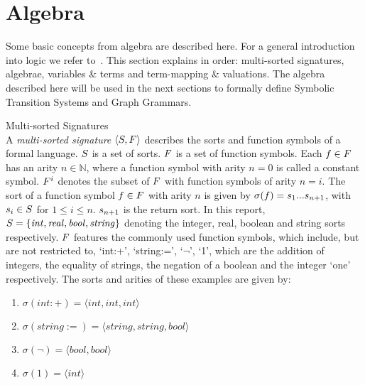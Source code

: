 \section{Algebra}\label{sec:algebra}

Some basic concepts from algebra are described here. For a general introduction into logic we refer to~\cite{Huth:logic}. This section explains in order: multi-sorted signatures, algebrae, variables \& terms and term-mapping \& valuations. The algebra described here will be used in the next sections to formally define Symbolic Transition Systems and Graph Grammars.

\vspace{10px}\begin{definition} Multi-sorted Signatures \\
A \textit{multi-sorted signature} $\langle S, F \rangle$ describes the sorts and function symbols of a formal language. $S$ is a set of sorts. $F$ is a set of function symbols. Each $f \in F$ has an arity $n \in \mathbb{N}$, where a function symbol with arity $n = 0$ is called a constant symbol. $F^i$ denotes the subset of $F$ with function symbols of arity $n = i$. The sort of a function symbol $f \in F$ with arity $n$ is given by $\sigma(f) = s_1 ... s_{n+1}$, with $s_i \in S$ for $1 \leq i \leq n$. $s_{n+1}$ is the return sort. In this report, $S =  \{\mathit{int, real, bool, string}\}$ denoting the integer, real, boolean and string sorts respectively. $F$ features the commonly used function symbols, which include, but are not restricted to, `int:+', `string:=', `$\neg$', `1', which are the addition of integers, the equality of strings, the negation of a boolean and the integer `one' respectively. The sorts and arities of these examples are given by:
\begin{enumerate}
\item $\sigma(int:+) = \langle int, int, int\rangle$
\item $\sigma(string:=) = \langle string, string, bool\rangle$
\item $\sigma(\neg) = \langle bool, bool\rangle$
\item $\sigma(1) = \langle int \rangle$
\end{enumerate}
\end{definition}

